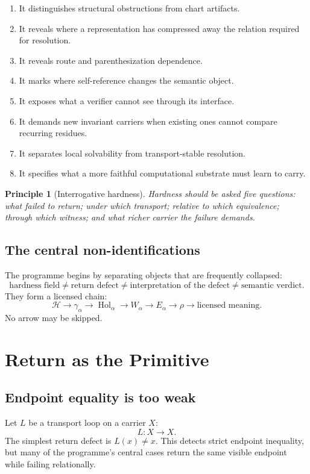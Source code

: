 \documentclass[12pt,openany]{book}
\newtheorem{principle}[definition]{Principle}
\theoremstyle{remark}
\DeclareMathOperator{\Hol}{Hol}
\newcommand{\Hard}{\mathcal H}
\begin{document}
\begin{enumerate}
\item It distinguishes structural obstructions from chart artifacts.
\item It reveals where a representation has compressed away the relation required for resolution.
\item It reveals route and parenthesization dependence.
\item It marks where self-reference changes the semantic object.
\item It exposes what a verifier cannot see through its interface.
\item It demands new invariant carriers when existing ones cannot compare recurring residues.
\item It separates local solvability from transport-stable resolution.
\item It specifies what a more faithful computational substrate must learn to carry.
\end{enumerate}

\begin{principle}[Interrogative hardness]
Hardness should be asked five questions: what failed to return; under which transport; relative to which equivalence; through which witness; and what richer carrier the failure demands.
\end{principle}

\section{The central non-identifications}
The programme begins by separating objects that are frequently collapsed:
\[
\text{hardness field}
\neq
\text{return defect}
\neq
\text{interpretation of the defect}
\neq
\text{semantic verdict}.
\]
They form a licensed chain:
\[
\Hard
\longrightarrow
\gamma_\alpha
\longrightarrow
\Hol_\alpha
\longrightarrow
W_\alpha
\longrightarrow
E_\alpha
\longrightarrow
\rho
\longrightarrow
\text{licensed meaning}.
\]
No arrow may be skipped.

\chapter{Return as the Primitive}
\label{ch:return-primitive}

\section{Endpoint equality is too weak}
Let $L$ be a transport loop on a carrier $X$:
\[
L:X\to X.
\]
The simplest return defect is $L(x)\neq x$. This detects strict endpoint inequality, but many of the programme's central cases return the same visible endpoint while failing relationally.
\end{document}
